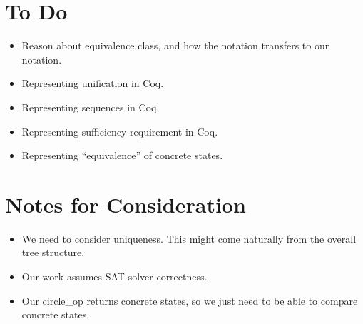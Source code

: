 \documentclass[a4paper]{article}
\begin{document}
\section{To Do}
\begin{itemize}
\item Reason about equivalence class, and how the notation transfers to our notation.
\item Representing unification in Coq.
\item Representing sequences in Coq.
\item Representing sufficiency requirement in Coq.
\item Representing ``equivalence'' of concrete states.

\end{itemize}

\section{Notes for Consideration}
\begin{itemize}
\item We need to consider uniqueness. This might come naturally from the overall tree structure.
\item Our work assumes SAT-solver correctness.
\item Our circle\_op returns concrete states, so we just need to be able to compare concrete states.
\end{itemize}



\end{document}

